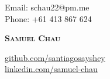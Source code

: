 
\begin{adjustwidth}{0.15in}{0.15in} %
  \begin{minipage}[c]{0.97\textwidth} %
    \begin{minipage}[c]{0.30\textwidth}
      \raggedright
      \small
      Email: schau22@pm.me \\
      Phone: +61 413 867 624
    \end{minipage}%
    \begin{minipage}[c]{0.40\textwidth}
      \centering
      \textbf{\Huge \scshape Samuel Chau}
    \end{minipage}%
    \begin{minipage}[c]{0.30\textwidth}
      \raggedleft
      \small
      \href{https://github.com/santiagosayshey}{github.com/santiagosayshey} \\
      \href{https://linkedin.com/in/samuel-chau-7324a0305/}{linkedin.com/samuel-chau}
    \end{minipage}
  \end{minipage}
\end{adjustwidth}
\vspace{10pt} %